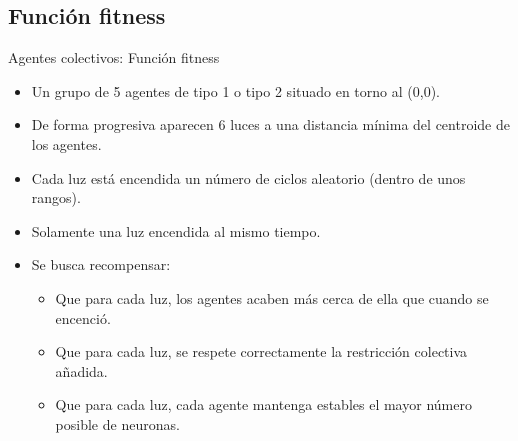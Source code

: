 \documentclass[aspectratio=169]{beamer}
\begin{document}
\subsection{Función fitness}
\begin{frame}{Agentes colectivos: Función fitness}
  \begin{itemize}
    \item Un grupo de 5 agentes de tipo 1 o tipo 2 situado en torno al (0,0).
    \item De forma progresiva aparecen 6 luces a una distancia mínima del centroide de los agentes.
    \item Cada luz está encendida un número de ciclos aleatorio (dentro de unos rangos).
    \item Solamente una luz encendida al mismo tiempo.
    \item Se busca recompensar:
    \begin{itemize}
      \item Que para cada luz, los agentes acaben más cerca de ella que cuando se encenció.
      \item Que para cada luz, se respete correctamente la restricción colectiva añadida.
      \item Que para cada luz, cada agente mantenga estables el mayor número posible de neuronas.
    \end{itemize}
  \end{itemize}

\end{frame}
\end{document}
